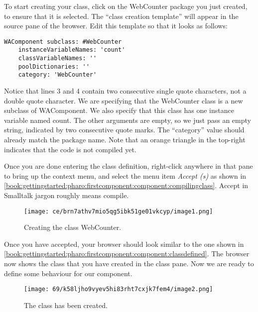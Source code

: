 \documentclass[a4paper,10pt,twoside]{book}
\newcommand{\ct}[1]{{\small\ttfamily\textup{#1}}}
\begin{document}
To start creating your class, click on the \ct{WebCounter} package you just created, to ensure that it is selected. The ``class creation template'' will appear in the source pane of the browser. Edit this template so that it looks as follows:

\begin{lstlisting}
WAComponent subclass: #WebCounter
    instanceVariableNames: 'count'
    classVariableNames: ''
    poolDictionaries: ''
    category: 'WebCounter'
\end{lstlisting}

Notice that lines 3 and 4 contain two consecutive single quote characters, not a double quote character. We are specifying that the \ct{WebCounter} class is a new subclass of \ct{WAComponent}. We also specify that this class has one instance variable named \ct{count}. The other arguments are empty, so we just pass an empty string, indicated by two consecutive quote marks. The ``category'' value should already match the package name. Note that an orange triangle in the top-right indicates that the code is not compiled yet.

Once you are done entering the class definition, right-click anywhere in that pane to bring up the context menu, and select the menu item \textit{Accept (s)} as shown in \autoref{book:gettingstarted:pharo:firstcomponent:component:compilingclass}. Accept in Smalltalk jargon roughly means compile.

\begin{figure}[h!tbp]
	\begin{center}
		\texttt{[image: ce/brn7athv7mio5qg5ibk51ge01vkcyp/image1.png]}
		\caption{Creating the class WebCounter.\label{book:gettingstarted:pharo:firstcomponent:component:compilingclass}}
	\end{center}
\end{figure}


Once you have accepted, your browser should look similar to the one shown in \autoref{book:gettingstarted:pharo:firstcomponent:component:classdefined}. The browser now shows the class that you have created in the class pane. Now we are ready to define some behaviour for our component.

\begin{figure}[h!tbp]
	\begin{center}
		\texttt{[image: 69/k58ljho9vyev5hi83rht7cxjk7fem4/image2.png]}
		\caption{The class has been created.\label{book:gettingstarted:pharo:firstcomponent:component:classdefined}}
	\end{center}
\end{figure}
\end{document}
